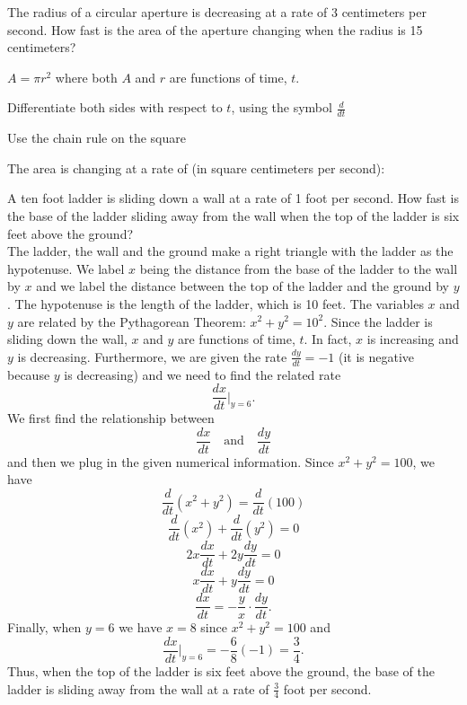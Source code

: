 \documentclass{ximera}
\begin{document}
\begin{question}
The radius of a circular aperture is decreasing at a rate of 3 centimeters per second.  
How fast is the area of the aperture changing when the radius is 15 centimeters?

\begin{hint}
$A = \pi r^2$ where both $A$ and $r$ are functions of time, $t$.
\end{hint}

\begin{hint}
Differentiate both sides with respect to $t$, using the symbol $\frac{d}{dt}$
\end{hint}
\begin{hint}
Use the chain rule on the square
\end{hint}

The area is changing at a rate of (in square centimeters per second):
\begin{multipleChoice}
\choice{$90 \pi$}
\choice[correct]{$-90 \pi$}
\choice{$-120 \pi$}
\end{multipleChoice}
\end{question}


\begin{example}
A ten foot ladder is sliding down a wall at a rate of 1 foot per second.  How fast is the base of the 
ladder sliding away from the wall when the top of the ladder is six feet above the ground?\\
 The ladder, the wall and the ground make a right triangle with the ladder as the hypotenuse.  
We label $x$ being the distance from the base of the ladder 
to the wall by $x$ and we label  the distance between the top of the ladder and the ground by $y$. 
The hypotenuse is the length of the
ladder, which is 10 feet. The variables $x$ and $y$ are related by the 
Pythagorean Theorem: $x^2 + y^2 = 10^2$. Since the ladder is
sliding down the wall, $x$ and $y$ are functions of time, $t$. 
In fact, $x$ is increasing and $y$ is decreasing. Furthermore, we are given 
the rate $\frac{dy}{dt} = -1$ (it is negative because $y$ is decreasing)
and we need to find the related rate
\[\frac{dx}{dt}\bigg|_{y = 6}.\]
We first find the relationship between 
\[\frac{dx}{dt} \quad \text{and} \quad \frac{dy}{dt}\]
and then we plug in the given numerical information.
Since $x^2 + y^2 = 100$, we have
\[\frac{d}{dt} (x^2 + y^2 ) = \frac{d}{dt}(100)\]
\[\frac{d}{dt} (x^2) +\frac{d}{dt}(y^2 ) = 0\]
\[2x\frac{dx}{dt} + 2y\frac{dy}{dt} = 0\]
\[x\frac{dx}{dt} + y\frac{dy}{dt} = 0\]
\[\frac{dx}{dt} =- \frac{y}{x}\cdot \frac{dy}{dt}. \]
Finally, when $y= 6$ we have $x=8$ since $x^2 + y^2 = 100$ and
\[\frac{dx}{dt}\bigg|_{y = 6}= -\frac68 (-1) = \frac34.\]
Thus, when the top of the ladder is six feet above the ground, 
the base of the ladder is sliding away from the wall 
at a rate of $\frac34$ foot per second.

\begin{center}
\end{center}



\end{example}
\end{document}
